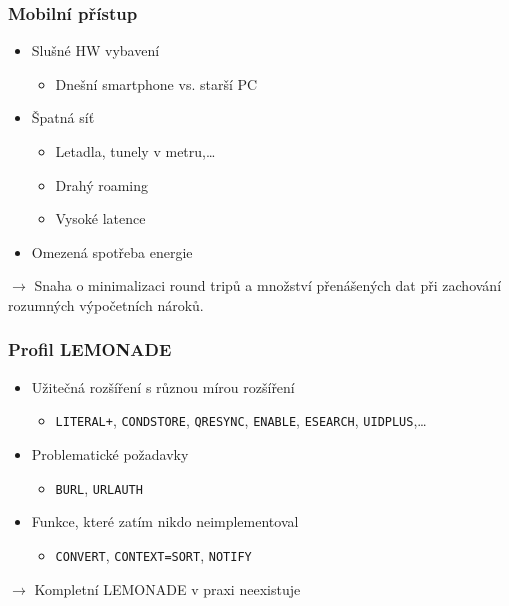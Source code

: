 \documentclass{beamer}
\begin{document}
\begin{frame}[fragile]
  \frametitle{Mobilní přístup}
  \begin{itemize}
    \item Slušné HW vybavení
      \begin{itemize}
        \item Dnešní smartphone vs. starší PC
      \end{itemize}
    \item Špatná síť
      \begin{itemize}
        \item Letadla, tunely v metru,\ldots
        \item Drahý roaming
        \item Vysoké latence
      \end{itemize}
    \item Omezená spotřeba energie
  \end{itemize}

   {
  \begin{center}
  \vspace{4mm}
  $\rightarrow$ \alert{Snaha o minimalizaci round tripů a množství přenášených dat při zachování rozumných výpočetních
  nároků.}
  \end{center}}
\end{frame}

\begin{frame}[fragile]
  \frametitle{Profil LEMONADE}
  \begin{itemize}
    \item Užitečná rozšíření s různou mírou rozšíření
      \begin{itemize}
        \item {\tt LITERAL+}, {\tt CONDSTORE}, {\tt QRESYNC}, {\tt ENABLE}, {\tt ESEARCH}, {\tt UIDPLUS},\ldots
      \end{itemize}
    \item Problematické požadavky
      \begin{itemize}
        \item {\tt BURL}, {\tt URLAUTH}
      \end{itemize}
    \item Funkce, které zatím nikdo neimplementoval
      \begin{itemize}
        \item {\tt CONVERT}, {\tt CONTEXT=SORT}, {\tt NOTIFY}
      \end{itemize}
  \end{itemize}

   {
  \begin{center}
  \vspace{4mm}
  $\rightarrow$ \alert{Kompletní LEMONADE v praxi neexistuje}
  \end{center}}
\end{frame}
\end{document}
